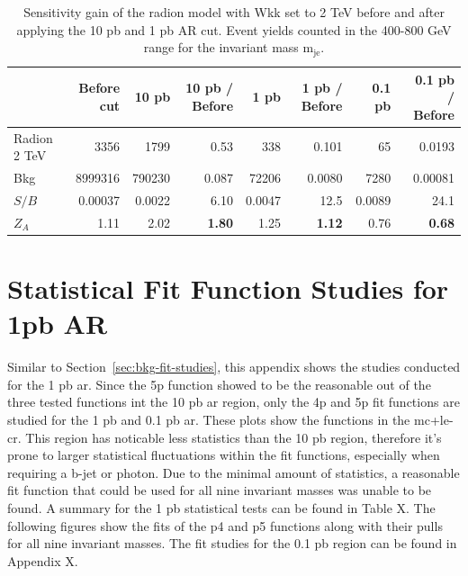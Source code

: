 \begin{table}[!htbp]
    \begin{footnotesize}
    \begin{center}
         \begin{tabular}{lr|rr|rr|rr}
             \hline
                  & {Before cut} &  {10 pb} & {10 pb / Before} &  {1 pb} & {1 pb / Before} &  {0.1 pb} & {0.1 pb / Before}\\
             \hline
             Radion 2 TeV     & 3356     & 1799    & 0.53           & 338        & 0.101       & 65        & 0.0193 \\
             Bkg              & 8999316  & 790230  & 0.087          & 72206      & 0.0080      & 7280      & 0.00081 \\
             $S/B$            & 0.00037  & 0.0022  & 6.10           & 0.0047     & 12.5         & 0.0089    & 24.1 \\
             $Z_A$            & 1.11     & 2.02    & {\bf 1.80}     & 1.25       & {\bf 1.12}       & 0.76      & {\bf 0.68} \\
             \hline
         \end{tabular}
    \end{center}
    \end{footnotesize}
    \caption{Sensitivity gain of the radion model with Wkk set to 2 TeV before and after applying the 10 pb and 1 pb AR cut. Event yields counted in the 400-800 GeV range for the invariant mass $\textrm{m}_{\textrm{je}}$.}
\label{tab:signal-reduction-radion}
 \end{table}

 \newpage

 \vspace*{0.5in}

\section{Statistical Fit Function Studies for 1pb AR}
\label{appendix:1pb-fit-studies}
\setcounter{equation}{0}

Similar to Section~\ref{sec:bkg-fit-studies}, this appendix shows the studies conducted for the 1 pb \gls{ar}. Since the 5p function showed to be the reasonable out of the three 
tested functions int the 10 pb \gls{ar} region, only the 4p and 5p fit functions are studied for the 1 pb and 0.1 pb \gls{ar}. These plots show the functions in the 
\gls{mc}+\gls{le-cr}. This region has noticable less statistics than the 10 pb region, therefore it's prone to larger statistical fluctuations within the fit functions, 
especially when requiring a b-jet or photon. Due to the minimal amount of statistics, a reasonable fit function that could be used for all nine invariant masses was unable 
to be found. A summary for the 1 pb statistical tests can be found in Table X. The following figures show the fits of the p4 and p5 functions along with their pulls for 
all nine invariant masses. The fit studies for the 0.1 pb region can be found in Appendix X. 

